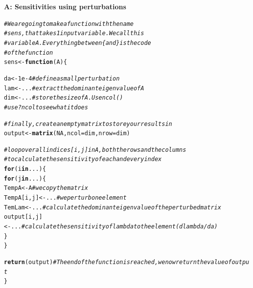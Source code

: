 \documentclass{article}\usepackage[]{graphicx}\usepackage[]{color}
\makeatletter
\newcommand{\hlnum}[1]{\textcolor[rgb]{0.686,0.059,0.569}{#1}}%
\newcommand{\hlcom}[1]{\textcolor[rgb]{0.678,0.584,0.686}{\textit{#1}}}%
\newcommand{\hlstd}[1]{\textcolor[rgb]{0.345,0.345,0.345}{#1}}%
\newcommand{\hlkwa}[1]{\textcolor[rgb]{0.161,0.373,0.58}{\textbf{#1}}}%
\newcommand{\hlkwb}[1]{\textcolor[rgb]{0.69,0.353,0.396}{#1}}%
\newcommand{\hlkwc}[1]{\textcolor[rgb]{0.333,0.667,0.333}{#1}}%
\newcommand{\hlkwd}[1]{\textcolor[rgb]{0.737,0.353,0.396}{\textbf{#1}}}%
\newenvironment{kframe}{%
 \def\at@end@of@kframe{}%
 \ifinner\ifhmode%
  \def\at@end@of@kframe{\end{minipage}}%
  \begin{minipage}{\columnwidth}%
 \fi\fi%
 \def\FrameCommand##1{\hskip\@totalleftmargin \hskip-\fboxsep
 \colorbox{shadecolor}{##1}\hskip-\fboxsep
     \hskip-\linewidth \hskip-\@totalleftmargin \hskip\columnwidth}%
 \MakeFramed {\advance\hsize-\width
   \@totalleftmargin\z@ \linewidth\hsize
   \@setminipage}}%
 {\par\unskip\endMakeFramed%
 \at@end@of@kframe}
\newenvironment{knitrout}{}{} %
\makeatother
\begin{document}
\begin{mdframed}\textbf{A: Sensitivities using perturbations}\\

\begin{knitrout}
\color{fgcolor}\begin{kframe}
\begin{alltt}
\hlcom{# We are going to make a function with the name}
\hlcom{# sens, that takes 1 input variable. We call this}
\hlcom{# variable A. Everything between \{ and \} is the code}
\hlcom{# of the function}
\hlstd{sens} \hlkwb{<-} \hlkwa{function}\hlstd{(}\hlkwc{A}\hlstd{)\{}

  \hlstd{da} \hlkwb{<-} \hlnum{1e-4} \hlcom{# define a small perturbation}
  \hlstd{lam} \hlkwb{<-} \hlstd{...}  \hlcom{# extract the dominant eigenvalue of A}
  \hlstd{dim} \hlkwb{<-} \hlstd{...} \hlcom{# store the size of A. Use ncol()}
             \hlcom{# use ?ncol to see what it does}

  \hlcom{# finally, create an empty matrix to store your results in}
  \hlstd{output} \hlkwb{<-} \hlkwd{matrix}\hlstd{(}\hlnum{NA}\hlstd{,}\hlkwc{ncol}\hlstd{=dim,}\hlkwc{nrow}\hlstd{=dim)}

  \hlcom{# loop over all indices [i,j] in A, both the rows and the columns}
  \hlcom{# to calculate the sensitivity of each and every index}
  \hlkwa{for}\hlstd{(i} \hlkwa{in} \hlstd{...)\{}
    \hlkwa{for}\hlstd{(j} \hlkwa{in} \hlstd{...)\{}
      \hlstd{TempA} \hlkwb{<-} \hlstd{A} \hlcom{# we copy the matrix}
      \hlstd{TempA[i,j]} \hlkwb{<-} \hlstd{...} \hlcom{# we perturb one element}
      \hlstd{TemLam} \hlkwb{<-} \hlstd{...} \hlcom{# calculate the dominant eigenvalue of the perturbed matrix}
      \hlstd{output[i,j]} \hlkwb{<-} \hlstd{...} \hlcom{# calculate the sensitivity of lambda to the element (dlambda/da)}
    \hlstd{\}}
  \hlstd{\}}

  \hlkwd{return}\hlstd{(output)} \hlcom{# The end of the function is reached, we now return the value of output}
\hlstd{\}}
\end{alltt}
\end{kframe}
\end{knitrout}

\end{mdframed}
\end{document}
